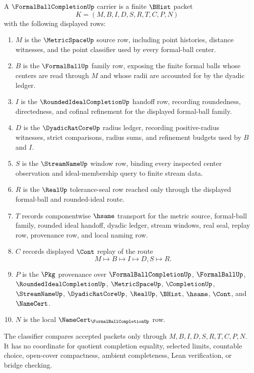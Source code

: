 \begin{definition}
\label{def:formal-ball-completion-carrier}
A $\FormalBallCompletionUp$ carrier is a finite $\BHist$ packet
$$
K=(M,B,I,D,S,R,T,C,P,N)
$$
with the following displayed rows:
\begin{enumerate}
\item $M$ is the $\MetricSpaceUp$ source row, including point histories, distance witnesses, and the point classifier used by every formal-ball center.
\item $B$ is the $\FormalBallUp$ family row, exposing the finite formal balls whose centers are read through $M$ and whose radii are accounted for by the dyadic ledger.
\item $I$ is the $\RoundedIdealCompletionUp$ handoff row, recording roundedness, directedness, and cofinal refinement for the displayed formal-ball family.
\item $D$ is the $\DyadicRatCoreUp$ radius ledger, recording positive-radius witnesses, strict comparisons, radius sums, and refinement budgets used by $B$ and $I$.
\item $S$ is the $\StreamNameUp$ window row, binding every inspected center observation and ideal-membership query to finite stream data.
\item $R$ is the $\RealUp$ tolerance-seal row reached only through the displayed formal-ball and rounded-ideal route.
\item $T$ records componentwise $\hsame$ transport for the metric source, formal-ball family, rounded ideal handoff, dyadic ledger, stream windows, real seal, replay row, provenance row, and local naming row.
\item $C$ records displayed $\Cont$ replay of the route
$$
M \longmapsto B \longmapsto I \longmapsto D,S \longmapsto R .
$$
\item $P$ is the $\Pkg$ provenance over $\FormalBallCompletionUp$, $\FormalBallUp$, $\RoundedIdealCompletionUp$, $\MetricSpaceUp$, $\CompletionUp$, $\StreamNameUp$, $\DyadicRatCoreUp$, $\RealUp$, $\BHist$, $\hsame$, $\Cont$, and $\NameCert$.
\item $N$ is the local $\NameCert_{\FormalBallCompletionUp}$ row.
\end{enumerate}
The classifier compares accepted packets only through $M,B,I,D,S,R,T,C,P,N$. It has no coordinate for quotient completion equality, selected limits, countable choice, open-cover compactness, ambient completeness, Lean verification, or bridge checking.
\end{definition}

